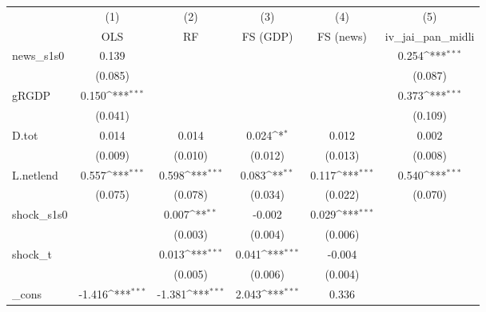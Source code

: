 {
\def\sym#1{\ifmmode^{#1}\else\(^{#1}\)\fi}
\begin{tabular}{l*{5}{c}}
\toprule
            &\multicolumn{1}{c}{(1)}&\multicolumn{1}{c}{(2)}&\multicolumn{1}{c}{(3)}&\multicolumn{1}{c}{(4)}&\multicolumn{1}{c}{(5)}\\
            &\multicolumn{1}{c}{OLS}&\multicolumn{1}{c}{RF}&\multicolumn{1}{c}{FS (GDP)}&\multicolumn{1}{c}{FS (news)}&\multicolumn{1}{c}{iv\_jai\_pan\_midli}\\
\midrule
news\_s1s0   &       0.139         &                     &                     &                     &       0.254\sym{***}\\
            &     (0.085)         &                     &                     &                     &     (0.087)         \\
\addlinespace
gRGDP       &       0.150\sym{***}&                     &                     &                     &       0.373\sym{***}\\
            &     (0.041)         &                     &                     &                     &     (0.109)         \\
\addlinespace
D.tot       &       0.014         &       0.014         &       0.024\sym{*}  &       0.012         &       0.002         \\
            &     (0.009)         &     (0.010)         &     (0.012)         &     (0.013)         &     (0.008)         \\
\addlinespace
L.netlend   &       0.557\sym{***}&       0.598\sym{***}&       0.083\sym{**} &       0.117\sym{***}&       0.540\sym{***}\\
            &     (0.075)         &     (0.078)         &     (0.034)         &     (0.022)         &     (0.070)         \\
\addlinespace
shock\_s1s0  &                     &       0.007\sym{**} &      -0.002         &       0.029\sym{***}&                     \\
            &                     &     (0.003)         &     (0.004)         &     (0.006)         &                     \\
\addlinespace
shock\_t     &                     &       0.013\sym{***}&       0.041\sym{***}&      -0.004         &                     \\
            &                     &     (0.005)         &     (0.006)         &     (0.004)         &                     \\
\addlinespace
\_cons      &      -1.416\sym{***}&      -1.381\sym{***}&       2.043\sym{***}&       0.336         &                     \\

\end{tabular}}
